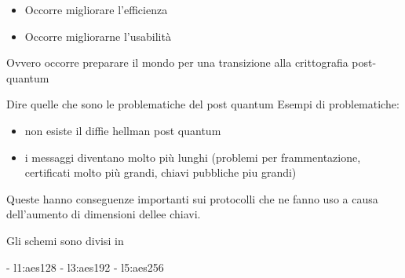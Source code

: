 \begin{itemize}
	\item Occorre migliorare l'efficienza 
	\item Occorre migliorarne l'usabilità
\end{itemize}

Ovvero occorre preparare il mondo per una transizione alla crittografia post-quantum

Dire quelle che sono le problematiche del post quantum
Esempi di problematiche:
\begin{itemize}
\item non esiste il diffie hellman post quantum
\item i messaggi diventano molto più lunghi (problemi per frammentazione,
	certificati molto più grandi, chiavi pubbliche piu grandi)
\end{itemize}

Queste hanno conseguenze importanti sui protocolli che ne fanno uso a causa dell'aumento di dimensioni dellee chiavi.


Gli schemi sono divisi in 

- l1:aes128
- l3:aes192
- l5:aes256


